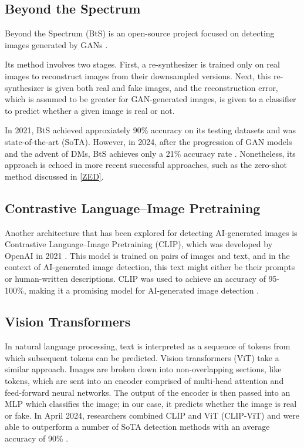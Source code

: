 \documentclass{article} %
\begin{document}
\subsection{Beyond the Spectrum}

Beyond the Spectrum (BtS) is an open-source project focused on detecting images generated by GANs \citep{he2021spectrumdetectingdeepfakesresynthesis}.

Its method involves two stages. First, a re-synthesizer is trained only on real images to reconstruct images from their downsampled versions. Next, this re-synthesizer is given both real and fake images, and the reconstruction error, which is assumed to be greater for GAN-generated images, is given to a classifier to predict whether a given image is real or not.

In 2021, BtS achieved approxiately 90\% accuracy on its testing datasets and was state-of-the-art (SoTA). However, in 2024, after the progression of GAN models and the advent of DMs, BtS achieves only a 21\% accuracy rate \citep{li2024adversarialaiartunderstandinggeneration}. Nonetheless, its approach is echoed in more recent successful approaches, such as the zero-shot method discussed in \ref{ZED}.

\subsection{Contrastive Language–Image Pretraining}

Another architecture that has been explored for detecting AI-generated images is Contrastive Language–Image Pretraining (CLIP), which was developed by OpenAI in 2021 \citep{radford2021learningtransferablevisualmodels}. This model is trained on pairs of images and text, and in the context of AI-generated image detection, this text might either be their prompts or human-written descriptions. CLIP was used to achieve an accuracy of 95-100\%, making it a promising model for AI-generated image detection \citep{moskowitz2024detectingaigeneratedimagesclip}.

\subsection{Vision Transformers}

In natural language processing, text is interpreted as a sequence of tokens from which subsequent tokens can be predicted. Vision transformers (ViT) take a similar approach. Images are broken down into non-overlapping sections, like tokens, which are sent into an encoder comprised of multi-head attention and feed-forward neural networks. The output of the encoder is then passed into an MLP which classifies the image; in our case, it predicts whether the image is real or fake. In April 2024, researchers combined CLIP and ViT (CLIP-ViT) and were able to outperform a number of SoTA detection methods with an average accuracy of 90\% \citep{cozzolino2024raisingbaraigeneratedimage}.
\end{document}
